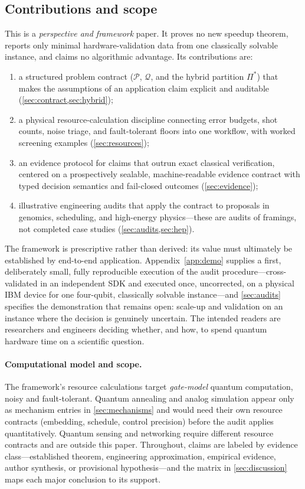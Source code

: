 \subsection{Contributions and scope}

This is a \emph{perspective and framework} paper. It proves no new speedup theorem, reports only minimal hardware-validation data from one classically solvable instance, and claims no algorithmic advantage. Its contributions are:
\begin{enumerate}
  \item a structured problem contract ($\mathcal{P}$, $\mathcal{Q}$, and the hybrid partition $\Pi^{*}$) that makes the assumptions of an application claim explicit and auditable (\cref{sec:contract,sec:hybrid});
  \item a physical resource-calculation discipline connecting error budgets, shot counts, noise triage, and fault-tolerant floors into one workflow, with worked screening examples (\cref{sec:resources});
  \item an evidence protocol for claims that outrun exact classical verification, centered on a prospectively sealable, machine-readable evidence contract with typed decision semantics and fail-closed outcomes (\cref{sec:evidence});
  \item illustrative engineering audits that apply the contract to proposals in genomics, scheduling, and high-energy physics---these are audits of framings, not completed case studies (\cref{sec:audits,sec:hep}).
\end{enumerate}
The framework is prescriptive rather than derived: its value must ultimately be established by end-to-end application. Appendix~\ref{app:demo} supplies a first, deliberately small, fully reproducible execution of the audit procedure---cross-validated in an independent SDK and executed once, uncorrected, on a physical IBM device for one four-qubit, classically solvable instance---and \cref{sec:audits} specifies the demonstration that remains open: scale-up and validation on an instance where the decision is genuinely uncertain. The intended readers are researchers and engineers deciding whether, and how, to spend quantum hardware time on a scientific question.

\paragraph{Computational model and scope.} The framework's resource calculations target \emph{gate-model} quantum computation, noisy and fault-tolerant. Quantum annealing and analog simulation appear only as mechanism entries in \cref{sec:mechanisms} and would need their own resource contracts (embedding, schedule, control precision) before the audit applies quantitatively. Quantum sensing and networking require different resource contracts and are outside this paper. Throughout, claims are labeled by evidence class---established theorem, engineering approximation, empirical evidence, author synthesis, or provisional hypothesis---and the matrix in \cref{sec:discussion} maps each major conclusion to its support.
